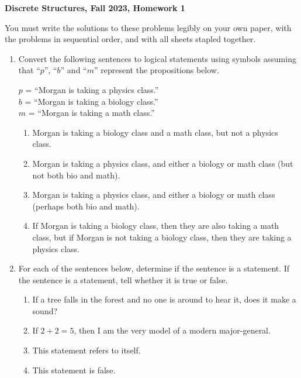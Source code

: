 \documentclass[11pt, letterpaper]{report}
\begin{document}
{\textbf{Discrete Structures, Fall 2023, Homework 1}}

\vspace*{.1in}

You must write the solutions to these problems legibly on your own paper, with
the problems in sequential order, and with all sheets stapled together.

\vspace*{.1in}

\begin{enumerate}

	\item Convert the following sentences to logical statements using symbols assuming that ``$p$'', ``$b$''
	and ``$m$'' represent the propositions below.  
	
	$p$ = ``Morgan is taking a physics class.'' \\
	$b$ = ``Morgan is taking a biology class.'' \\
	$m$ = ``Morgan is taking a math class.''
	
	\begin{enumerate}
		\item Morgan is taking a biology class and a math class, but not a physics class.
		\item Morgan is taking a physics class, and either a biology or math class (but not both bio and math).
		\item Morgan is taking a physics class, and either a biology or math class (perhaps both bio and math).
		\item If Morgan is taking a biology class, then they are also taking a math class, but if Morgan is not taking a 
		biology class, then they are taking a physics class.
	\end{enumerate}
	
	\item For each of the sentences below, determine if the sentence is a statement.  If
	the sentence is a statement, tell whether it is true or false.
	\begin{enumerate}
		\item If a tree falls in the forest and no one is around to hear it, does it make a sound?
		\item If $2+2=5$, then I am the very model of a modern major-general.
		\item This statement refers to itself.
		\item This statement is false.
	\end{enumerate}
	

\end{enumerate}
\end{document}
